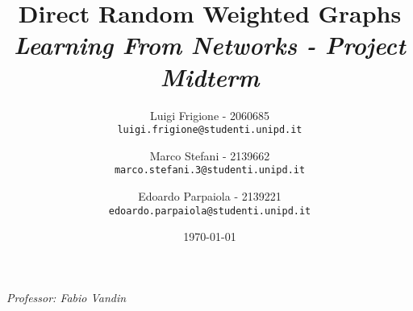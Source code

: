 \title{
    \textbf{Direct Random Weighted Graphs}\\[.5cm]
    
    {\large\emph{Learning From Networks - Project Midterm}}
}

\author{
  Luigi Frigione - 2060685\\
  \texttt{\small{luigi.frigione@studenti.unipd.it}}
  \and
  Marco Stefani - 2139662\\
  \texttt{\small{marco.stefani.3@studenti.unipd.it}}
  \and
  Edoardo Parpaiola - 2139221\\
  \texttt{\small{edoardo.parpaiola@studenti.unipd.it}}
}

\date{\today}

\maketitle

\vfill
{
    \emph{Professor: Fabio Vandin}
}